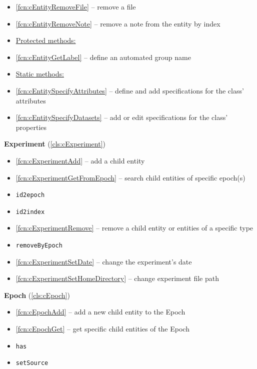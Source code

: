 \documentclass{aodatadocs}
\newcommand{\ret}[1]{\textcolor{purple5}{\texttt{#1}}}
\begin{document}
{\begin{legal}[font=\Large\bfseries, itemsep=1.5ex]
\begin{legal}[font=\large\bfseries, itemsep=1ex]
\begin{itemize}
            \item \ref{fcn:cEntityRemoveFile} -- remove a file
            \item \ref{fcn:cEntityRemoveNote} -- remove a note from the entity by index
            \item[] \hspace{-2.2ex}\underline{Protected methods:}
            \item \ref{fcn:cEntityGetLabel} -- define an automated group name 
            \item[] \hspace{-2.2ex}\underline{Static methods:}
            \item \ref{fcn:cEntitySpecifyAttributes} -- define and add specifications for the class' attributes
            \item \ref{fcn:cEntitySpecifyDatasets} -- add or edit specifications for the class' properties
        \end{itemize}
        \item {\large\textbf{Experiment} (\ref{cls:cExperiment})}
        \begin{itemize}
            \item \ref{fcn:cExperimentAdd} -- add a child entity
            \item \ref{fcn:cExperimentGetFromEpoch} -- search child entities of specific epoch(s)
            \item \ret{id2epoch}
            \item \ret{id2index}
            \item \ref{fcn:cExperimentRemove} -- remove a child entity or entities of a specific type
            \item \ret{removeByEpoch}
            \item \ref{fcn:cExperimentSetDate} -- change the experiment's date
            \item \ref{fcn:cExperimentSetHomeDirectory} -- change experiment file path 
        \end{itemize}
        \item {\large\textbf{Epoch} (\ref{cls:cEpoch})}
        \begin{itemize}
            \item \ref{fcn:cEpochAdd} -- add a new child entity to the Epoch
            \item \ref{fcn:cEpochGet} -- get specific child entities of the Epoch
            \item \ret{has}
            \item \ret{setSource}

\end{itemize}
\end{legal}
\end{legal}}
\end{document}
